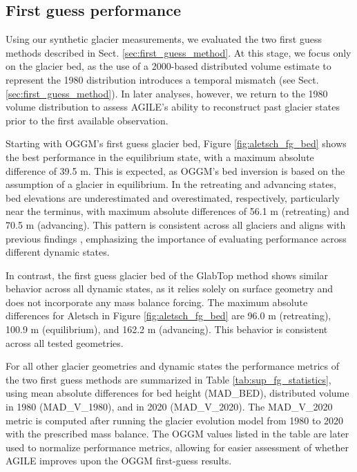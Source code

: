 \documentclass[journal abbreviation, manuscript]{copernicus}
\begin{document}
\subsection{First guess performance}
\label{sec:first_guess_performance}

Using our synthetic glacier measurements, we evaluated the two first guess methods described in Sect. \ref{sec:first_guess_method}. At this stage, we focus only on the glacier bed, as the use of a 2000-based distributed volume estimate to represent the 1980 distribution introduces a temporal mismatch (see Sect. \ref{sec:first_guess_method}). In later analyses, however, we return to the 1980 volume distribution to assess AGILE’s ability to reconstruct past glacier states prior to the first available observation.

Starting with OGGM's first guess glacier bed, Figure \ref{fig:aletsch_fg_bed} shows the best performance in the equilibrium state, with a maximum absolute difference of 39.5 m. This is expected, as OGGM’s bed inversion is based on the assumption of a glacier in equilibrium. In the retreating and advancing states, bed elevations are underestimated and overestimated, respectively, particularly near the terminus, with maximum absolute differences of 56.1 m (retreating) and 70.5 m (advancing). This pattern is consistent across all glaciers and aligns with previous findings \citep[e.g. Figure 5, panel d in][]{Maussion2019}, emphasizing the importance of evaluating performance across different dynamic states.

In contrast, the first guess glacier bed of the GlabTop method shows similar behavior across all dynamic states, as it relies solely on surface geometry and does not incorporate any mass balance forcing. The maximum absolute differences for Aletsch in Figure \ref{fig:aletsch_fg_bed} are 96.0 m (retreating), 100.9 m (equilibrium), and 162.2 m (advancing). This behavior is consistent across all tested geometries.

For all other glacier geometries and dynamic states the performance metrics of the two first guess methods are summarized in Table \ref{tab:sup_fg_statistics}, using mean absolute differences for bed height (MAD\_BED), distributed volume in 1980 (MAD\_V\_1980), and in 2020 (MAD\_V\_2020). The MAD\_V\_2020 metric is computed after running the glacier evolution model from 1980 to 2020 with the prescribed mass balance. The OGGM values listed in the table are later used to normalize performance metrics, allowing for easier assessment of whether AGILE improves upon the OGGM first-guess results.
\end{document}
